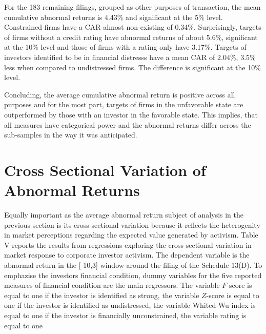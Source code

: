 \documentclass[12pt]{article}
\begin{document}
For the 183 remaining filings, grouped as other purposes of transaction, the mean cumulative abnormal returns is 4.43\% and significant at the 5\% level. Constrained firms have a CAR almost non-existing of 0.34\%. Surprisingly, targets of firms without a credit rating have abnormal returns of about 5.6\%, significant at the 10\% level and those of firms with a rating only have 3.17\%. 
Targets of investors identified to be in financial distresss have a mean CAR of 2.04\%, 3.5\% less when compared to undistressed firms. The difference is significant at the 10\% level. 

Concluding, the average cumulative abnormal return is positive across all purposes and for the most part, targets of firms in the unfavorable state are outperformed by those with an investor in the favorable state. This implies, that all measures have categorical power and the abnormal returns differ across the sub-samples in the way it was anticipated.

\section{Cross Sectional Variation of Abnormal Returns}

Equally important as the average abnormal return subject of analysis in the previous section is its cross-sectional variation because it reflects the heterogenity in market perceptions regarding the expected value generated by activism. Table V reports the results from regressions exploring the cross-sectional variation in market response to corporate investor activism. The dependent variable is the abnormal return in the [-10,3] window around the filing of the Schedule 13(D). To emphazise the investors financial condition, dummy variables for the five reported measures of financial condition are the main regressors. The variable $F$-score is equal to one if the investor is identified as strong, the variable $Z$-score is equal to one if the investor is identified as undistressed, the variable Whited-Wu index is equal to one if the investor is financially unconstrained, the variable rating is equal to one 


\end{document}
